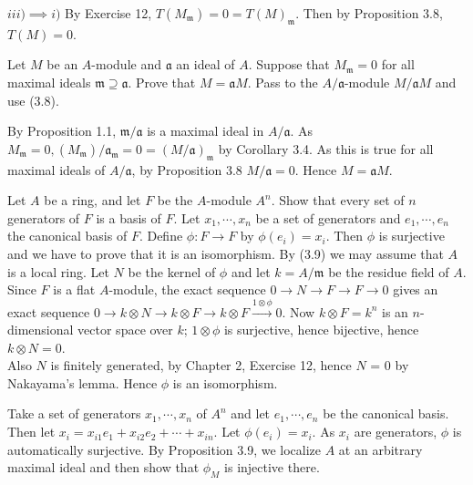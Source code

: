 \begin{questions}
\begin{solution}
	$iii) \implies i) $ By Exercise 12, $T(M_{\mathfrak{m}}) = 0 = T(M)_{\mathfrak{m}} $.
	Then by Proposition 3.8, $T(M) = 0 $.
\end{solution}

\question Let $M $ be an $A $-module and $\mathfrak{a} $ an ideal of $A $. Suppose that $M_{\mathfrak{m}} = 0 $ for all maximal ideals $\mathfrak{m} \supseteq \mathfrak{a} $. Prove that $M = \mathfrak{a}M $.
\ifhint
	Pass to the $A / \mathfrak{a} $-module $M / \mathfrak{a}M $ and use (3.8).
\fi
\begin{solution}
	By Proposition 1.1, $\mathfrak{m} / \mathfrak{a} $ is a maximal ideal in $A / \mathfrak{a} $.
	As $M_{\mathfrak{m}} = 0, (M_{\mathfrak{m}}) / \mathfrak{a}_{\mathfrak{m}} = 0 = (M / \mathfrak{a})_{\mathfrak{m}} $ by Corollary 3.4.
	As this is true for all maximal ideals of $A / \mathfrak{a} $, by Proposition 3.8 $M / \mathfrak{a} = 0 $.
	Hence $M = \mathfrak{a}M $.
\end{solution}

\question Let $A$ be a ring, and let $F$ be the $A$-module $A^n$. Show that every set of $n$ generators of $F$ is a basis of $F$.
\ifhint 
	Let $x_{1}, \cdots, x_n$ be a set of generators and $e_{1}, \cdots, e_n$ the canonical basis of $F$. Define $\phi: F \to F$ by $\phi(e_i) = x_i$. Then $\phi$ is surjective and we have to prove that it is an isomorphism. By (3.9) we may assume that $A$ is a local ring. Let $N$ be the kernel of $\phi$ and let $k = A /\mathfrak{m}$ be the residue field of $A$. Since $F$ is a flat $A$-module, the exact sequence $0 \to N \to F \to F \to 0 $ gives an exact sequence $0 \to k \otimes N \to k \otimes F \to k \otimes F \xrightarrow{1 \otimes \phi } 0$. Now $k \otimes F= k^n$ is an $n$-dimensional vector space over $k$; $1 \otimes \phi$ is surjective, hence bijective, hence $k \otimes N = 0$. \\
Also $N$ is finitely generated, by Chapter 2, Exercise 12, hence $N$ = 0 by Nakayama's lemma. Hence $\phi $ is an isomorphism.
\fi
\begin{solution}
	Take a set of generators $x_1,\cdots, x_n $ of $A^n $ and let $e_{1},\cdots, e_n $ be the canonical basis.
	Then let $x_{i} = x_{i1}e_{1} + x_{i2}e_{2} + \cdots + x_{in} $.
	Let $\phi(e_i) = x_i $.
	As $x_i $ are generators, $\phi  $ is automatically surjective.
	By Proposition 3.9, we localize $A $ at an arbitrary maximal ideal and then show that $\phi_M$ is injective there.


\end{solution}
\end{questions}
